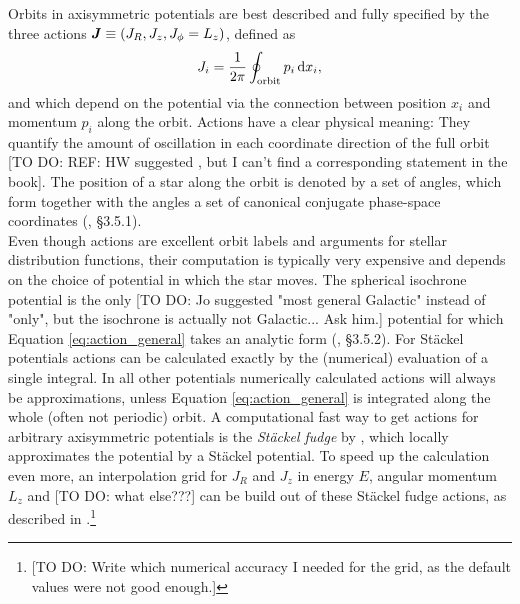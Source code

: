 
Orbits in axisymmetric potentials are best described and fully specified by the three actions $\boldsymbol{J} \equiv (J_R, J_z, J_\phi=L_z)$, defined as
\begin{equation}
J_i = \frac{1}{2\pi} \oint_\text{orbit} p_i \mathop{}\!\mathrm{d} x_i, \label{eq:action_general}
\end{equation}
and which depend on the potential via the connection between position $x_i$ and momentum $p_i$ along the orbit. Actions have a clear physical meaning: They quantify the amount of oscillation in each coordinate direction of the full orbit [TO DO: REF: HW suggested \citet{2008gady.book.....B}, but I can't find a corresponding statement in the book]. The position of a star along the orbit is denoted by a set of angles, which form together with the angles a set of canonical conjugate phase-space coordinates (\citealt{2008gady.book.....B}, \S 3.5.1). \\

Even though actions are excellent orbit labels and arguments for stellar distribution functions, their computation is typically very expensive and depends on the choice of potential in which the star moves. The spherical isochrone potential \citep{1959AnAp...22..126H} is the only [TO DO: Jo suggested "most general Galactic" instead of "only", but the isochrone is actually not Galactic... Ask him.] potential for which Equation \ref{eq:action_general} takes an analytic form (\citealt{2008gady.book.....B}, \S 3.5.2). For St\"{a}ckel potentials actions can be calculated exactly by the (numerical) evaluation of a single integral. In all other potentials numerically calculated actions will always be approximations, unless Equation \ref{eq:action_general} is integrated along the whole (often not periodic) orbit.  A computational fast way to get actions for arbitrary axisymmetric potentials is the \emph{St\"{a}ckel fudge} by \citet{2012MNRAS.426.1324B}, which locally approximates the potential by a St\"{a}ckel potential. To speed up the calculation even more, an interpolation grid for $J_R$ and $J_z$ in energy $E$, angular momentum $L_z$ and [TO DO: what else???] can be build out of these St\"{a}ckel fudge actions, as described in \citet{bov15}.\footnote{[TO DO: Write which numerical accuracy I needed for the grid, as the default values were not good enough.]} \\

